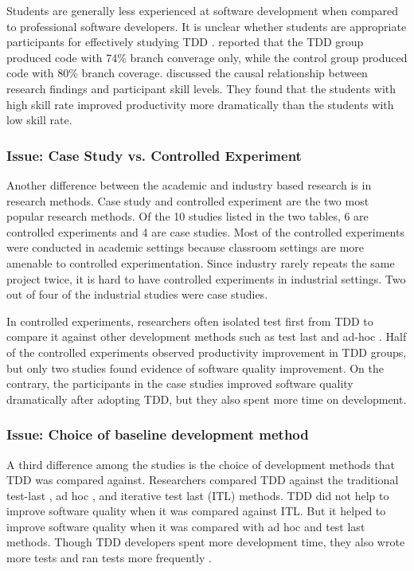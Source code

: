 \documentclass[smallextended]{svjour3}     %
\begin{document}
Students are generally less experienced at software development 
when compared to professional software developers. It is unclear 
whether students are appropriate participants for effectively
studying TDD \citep{Erdogmus:05}.  \cite{Muller:02} reported
that the TDD group produced code with 74\% branch converage only, while the control 
group produced code with 80\% branch coverage.
\cite{Erdogmus:05} discussed 
the causal relationship between research findings and participant 
skill levels. They found that the students with high skill rate 
improved productivity more dramatically than the students with 
low skill rate. 

\subsubsection{Issue: Case Study vs. Controlled Experiment}
Another difference between the academic and industry based research
is in research methods. Case study and 
controlled experiment are the two most popular research methods. 
Of the 10 studies listed in the two tables, 6 
are controlled experiments and 4 are case studies. Most of the
controlled experiments were conducted in academic settings because
classroom settings are more amenable to controlled experimentation. 
Since industry rarely repeats the same project twice, it is hard to have 
controlled experiments in industrial settings. Two out 
of four of the industrial studies were case studies. 

In controlled experiments, researchers often isolated test
first from TDD to compare it against other development 
methods such as test last and ad-hoc \citep{Muller:02,Matjaz:03,
Erdogmus:05,George:03,Geras:04}. Half of the controlled 
experiments \citep{George:03,Kaufmann:03,Erdogmus:05} observed 
productivity improvement in TDD groups, but only two studies 
found evidence of software quality improvement. On the contrary, 
the participants in the case studies improved software quality 
dramatically after adopting TDD, but they also spent more time 
on development.  

\subsubsection{Issue: Choice of baseline development method}

A third difference among the studies is the choice of
development methods that TDD was compared against. Researchers 
compared TDD against the traditional test-last \citep{Kaufmann:03,Geras:04}, 
ad hoc \citep{Muller:02,George:03}, and iterative test last 
(ITL) \citep{Matjaz:03,Erdogmus:05} methods. TDD did not help to 
improve software quality when it was compared against ITL. 
But it helped to improve software quality when it was compared 
with ad hoc and test last methods. Though TDD developers 
spent more development time, they also wrote more tests 
\citep{George:03,Erdogmus:05} and ran tests more frequently
\citep{Geras:04}.
\end{document}
